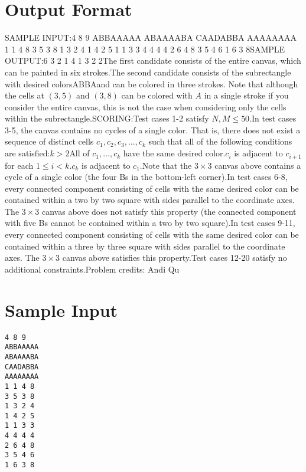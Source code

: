 \documentclass[12pt]{article}
\begin{document}
\section*{Output Format}
SAMPLE INPUT:4 8 9
ABBAAAAA
ABAAAABA
CAADABBA
AAAAAAAA
1 1 4 8
3 5 3 8
1 3 2 4
1 4 2 5
1 1 3 3
4 4 4 4
2 6 4 8
3 5 4 6
1 6 3 8SAMPLE OUTPUT:6
3
2
1
4
1
3
2
2The first candidate consists of the entire canvas, which can be painted in six
strokes.The second candidate consists of the subrectangle with desired colorsABBAand can be colored in three strokes. Note that although the cells at $(3,5)$ and
$(3,8)$ can be colored with $A$ in a single stroke if you consider the entire
canvas, this is not the case when considering only the cells within the
subrectangle.SCORING:Test cases 1-2 satisfy $N,M\le 50$.In test cases 3-5, the canvas contains no cycles of a single color. That is,
there does not exist a sequence of distinct cells $c_1,c_2,c_3,\ldots,c_k$  such
that all of the following conditions are satisfied:$k>2$All of $c_1,\ldots,c_k$ have the same desired color.$c_i$ is adjacent to $c_{i+1}$ for each $1\le i<k$.$c_k$ is adjacent to $c_1$.Note that the $3\times 3$ canvas above contains a cycle of a single color (the
four Bs in the bottom-left corner).In test cases 6-8, every connected component consisting of cells with the
same desired color can be contained within a two by two square with sides
parallel to the coordinate axes. The $3\times 3$ canvas above does not satisfy
this property (the connected component with five Bs cannot be contained within a
two by two square).In test cases 9-11, every connected component consisting of cells with the
same desired color can be contained within a three by three square with sides
parallel to the coordinate axes. The $3\times 3$ canvas above satisfies this
property.Test cases 12-20 satisfy no additional constraints.Problem credits: Andi Qu

\section*{Sample Input}
\begin{verbatim}
4 8 9
ABBAAAAA
ABAAAABA
CAADABBA
AAAAAAAA
1 1 4 8
3 5 3 8
1 3 2 4
1 4 2 5
1 1 3 3
4 4 4 4
2 6 4 8
3 5 4 6
1 6 3 8
\end{verbatim}
\end{document}
